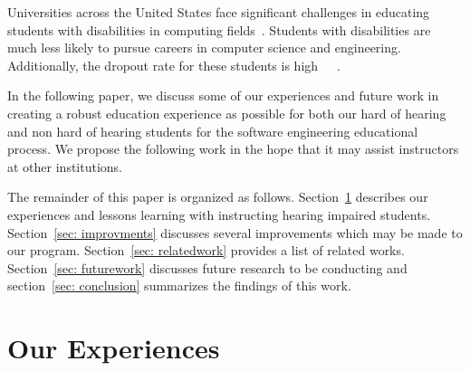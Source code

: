 \documentclass{acm_proc_article-sp}
\begin{document}


Universities across the United States face significant challenges in educating students with disabilities in computing fields~\cite{Cavender:2009:SAA:1508865.1509043}. Students with disabilities are much less likely to pursue careers in computer science and engineering. Additionally, the dropout rate for these students is high~\cite{4418169}~\cite{national2000women}~\cite{Bueno:2007:ALA:1268784.1268903}. 




In the following paper, we discuss some of our experiences and future work in creating a robust education experience as possible for both our hard of hearing and non hard of hearing students for the software engineering educational process. We propose the following work in the hope that it may assist instructors at other institutions.


The remainder of this paper is organized as follows. Section~\ref{sec: ourexperiences} describes our experiences and lessons learning with instructing hearing impaired students. Section~\ref{sec: improvments} discusses several improvements which may be made to our program. Section~\ref{sec: relatedwork} provides a list of related works. Section~\ref{sec: futurework} discusses future research to be conducting and section~\ref{sec: conclusion} summarizes the findings of this work.










\section{Our Experiences}
\label{sec: ourexperiences}


\end{document}
